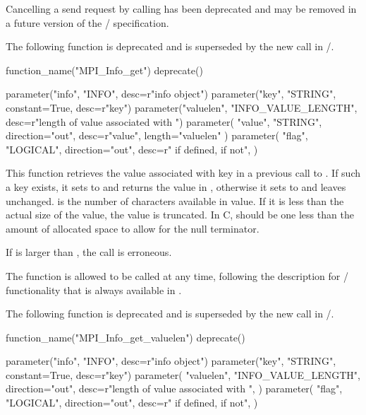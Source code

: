 \label{sec:deprecated-send-cancel}
Cancelling a send request by calling  has been deprecated and may be removed in a future version of the \MPI/ specification.


\deprecatedsep
The following function is deprecated and is superseded by the new
 call in \mpiivdoto/. 

%
\begin{mpi-binding}
    function_name("MPI_Info_get")
    deprecate()
    
    parameter("info", "INFO", desc=r"info object")
    parameter("key", "STRING", constant=True, desc=r"key")
    parameter("valuelen", "INFO_VALUE_LENGTH", desc=r"length of value associated with ")
    parameter(
        "value", "STRING", direction="out", desc=r"value", length="valuelen"
    )
    parameter(
        "flag",
        "LOGICAL",
        direction="out",
        desc=r" if  defined,  if not",
    )
\end{mpi-binding}

This function retrieves the value associated with key in a previous call to 
. If such a key exists, it sets  to  
and returns the value in ,
otherwise it sets  to  and leaves
 unchanged. 
 is the number of characters available in 
value. If it is less than the actual size of the value, the value is
truncated. In C,  should
be one less than the amount of allocated space to allow
for the null terminator. 

If  is larger than , 
the call is erroneous. 

The function  is allowed to be called at any time, following the description for \MPI/ functionality that is always available in .

\deprecatedsep
The following function is deprecated and is superseded by the new
 call in \mpiivdoto/. 

\begin{mpi-binding}
    function_name("MPI_Info_get_valuelen")
    deprecate()
    
    parameter("info", "INFO", desc=r"info object")
    parameter("key", "STRING", constant=True, desc=r"key")
    parameter(
        "valuelen",
        "INFO_VALUE_LENGTH",
        direction="out",
        desc=r"length of value associated with ",
    )
    parameter(
        "flag",
        "LOGICAL",
        direction="out",
        desc=r" if  defined,  if not",
    )
\end{mpi-binding}

